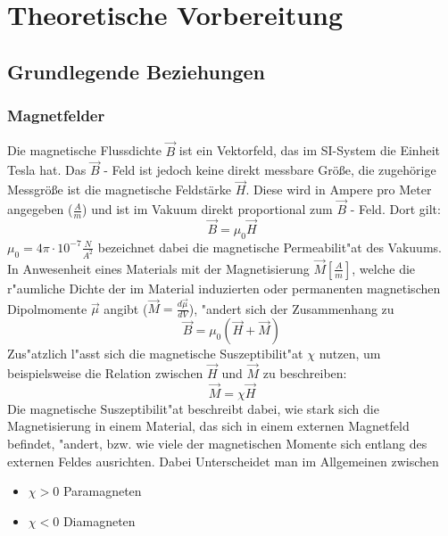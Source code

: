 \section{Theoretische Vorbereitung}
    \subsection{Grundlegende Beziehungen}
        \subsubsection{Magnetfelder}
            Die magnetische Flussdichte $\vec{B}$ ist ein Vektorfeld, das im SI-System die Einheit Tesla hat.
            Das $\vec{B}$ - Feld ist jedoch keine direkt messbare Größe, die zugehörige Messgröße ist die magnetische Feldstärke $\vec{H}$.
            Diese wird in Ampere pro Meter angegeben ($\frac{A}{m}$) und ist im Vakuum direkt proportional
            zum $\vec{B}$ - Feld. Dort gilt:
            \begin{equation}
                \vec{B} = \mu_0 \vec{H}
            \end{equation}
            $\mu_0 = 4\pi \cdot 10^{-7}\frac{N}{A^2}$ bezeichnet dabei die magnetische Permeabilit"at des Vakuums.
            In Anwesenheit eines Materials mit der Magnetisierung $\vec{M} [\frac{A}{m}]$, welche die r"aumliche Dichte der im Material induzierten oder permanenten magnetischen Dipolmomente $\vec{\mu}$ angibt ($\vec{M} = \frac{d\vec{\mu}}{dV}$), "andert sich der Zusammenhang zu
            \begin{equation}
                \vec{B} = \mu_0 (\vec{H} + \vec{M})
            \end{equation}
            Zus"atzlich l"asst sich die magnetische Suszeptibilit"at $\chi$ nutzen, um beispielsweise die Relation zwischen $\vec{H}$ und $\vec{M}$ zu beschreiben:
            \begin{equation}
                \vec{M} = \chi \vec{H}
            \end{equation}
            Die magnetische Suszeptibilit"at beschreibt dabei, wie stark sich die Magnetisierung in einem
            Material, das sich in einem externen Magnetfeld befindet, "andert, bzw. wie viele der magnetischen Momente sich entlang des externen Feldes ausrichten.
            Dabei Unterscheidet man im Allgemeinen zwischen
            \begin{itemize}
                \item $\chi > 0$ Paramagneten
                \item $\chi < 0$ Diamagneten
            \end{itemize}
